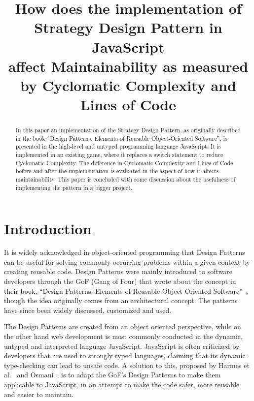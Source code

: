 \documentclass[conference, a4paper]{IEEEtran}
\begin{document}
\title{How does the implementation of\\
Strategy Design Pattern in JavaScript\\
affect Maintainability as measured by Cyclomatic Complexity and Lines of Code}
\author{
}

\maketitle

\begin{abstract}
	 In this paper an implementation of the Strategy Design Pattern, as originally described in the book ``Design Patterns: Elements of Reusable Object-Oriented Software'', is presented in the high-level and untyped programming language JavaScript. It is implemented in an existing game, where it replaces a switch statement to reduce Cyclomatic Complexity. The difference in Cyclomatic Complexity and Lines of Code before and after the implementation is evaluated in the aspect of how it affects maintainability. This paper is concluded with some discussion about the usefulness of implementing the pattern in a bigger project.
\end{abstract}

\section{Introduction}
\label{sec:Introduction}
It is widely acknowledged in object-oriented programming that Design Patterns can be useful for solving commonly occurring problems within a given context  by creating reusable code. Design Patterns were mainly introduced to software developers through the GoF (Gang of Four) that wrote about the concept in their book, ``Design Patterns: Elements of Reusable Object-Oriented Software''~\cite{bibitem:GoF}, though the idea originally comes from an architectural concept. The patterns have since been widely discussed, customized and used.

The Design Patterns are created from an object oriented perspective, while on the other hand web development is most commonly conducted in the dynamic, untyped and interpreted language JavaScript. JavaScript is often criticized by developers that are used to strongly typed languages, claiming that its dynamic type-checking can lead to unsafe code. A solution to this, proposed by Harmes et al.~\cite{bibitem:DiazHarmes} and Osmani~\cite{bibitem:Osmani}, is to adapt the GoF's Design Patterns to make them applicable to JavaScript, in an attempt to make the code safer, more reusable and easier to maintain.
\end{document}
